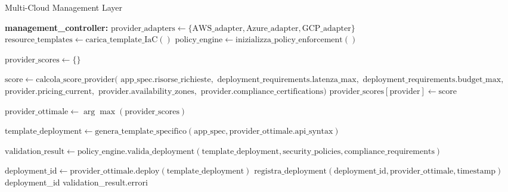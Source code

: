 \begin{algorithm}[H]
\caption{Multi-Cloud Management Layer}
\label{alg:multi-cloud-management}
\begin{algorithmic}[1]
\State \textbf{management\_controller:}
\State $\text{provider\_adapters} \leftarrow \{\text{AWS\_adapter}, \text{Azure\_adapter}, \text{GCP\_adapter}\}$
\State $\text{resource\_templates} \leftarrow \text{carica\_template\_IaC}()$
\State $\text{policy\_engine} \leftarrow \text{inizializza\_policy\_enforcement}()$

    \State $\text{provider\_scores} \leftarrow \{\}$
    
        \State $\text{score} \leftarrow \text{calcola\_score\_provider}($
        \State \hspace{2em} $\text{app\_spec.risorse\_richieste},$
        \State \hspace{2em} $\text{deployment\_requirements.latenza\_max},$
        \State \hspace{2em} $\text{deployment\_requirements.budget\_max},$
        \State \hspace{2em} $\text{provider.pricing\_current},$
        \State \hspace{2em} $\text{provider.availability\_zones},$
        \State \hspace{2em} $\text{provider.compliance\_certifications})$
        \State $\text{provider\_scores}[\text{provider}] \leftarrow \text{score}$
    \EndFor
    
    \State $\text{provider\_ottimale} \leftarrow \arg\max(\text{provider\_scores})$
    
    \State $\text{template\_deployment} \leftarrow \text{genera\_template\_specifico}(\text{app\_spec}, \text{provider\_ottimale.api\_syntax})$
    
    \State $\text{validation\_result} \leftarrow \text{policy\_engine.valida\_deployment}(\text{template\_deployment}, \text{security\_policies}, \text{compliance\_requirements})$
    
        \State $\text{deployment\_id} \leftarrow \text{provider\_ottimale.deploy}(\text{template\_deployment})$
        \State $\text{registra\_deployment}(\text{deployment\_id}, \text{provider\_ottimale}, \text{timestamp})$
        \State \Return deployment\_id
    \Else
        \State \Return validation\_result.errori
    \EndIf
\EndFunction
\end{algorithmic}
\end{algorithm}

